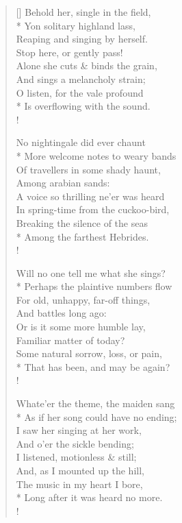 \documentclass[MAIN]{subfiles}
\begin{document}
\settowidth{\versewidth}{Behold her, single in the field,}
\begin{verse}[\versewidth]
Behold her, single in the field,\\* 
\vin Yon solitary highland lass,\\
Reaping and singing by herself.\\ 
\vin Stop here, or gently pass!\\
Alone she cuts \& binds the grain,\\
And sings a melancholy strain;\\
O listen, for the vale profound\\*
Is overflowing with the sound.\\!

No nightingale did ever chaunt\\* 
\vin More welcome notes to weary bands\\ 
Of travellers in some shady haunt,\\
\vin Among arabian sands:\\
A voice so thrilling ne'er was heard\\
In spring-time from the cuckoo-bird,\\
Breaking the silence of the seas\\*
Among the farthest Hebrides.\\!

Will no one tell me what she sings?\\* 
\vin Perhaps the plaintive numbers flow\\
For old, unhappy, far-off things,\\
\vin And battles long ago:\\
Or is it some more humble lay,\\ 
Familiar matter of today?\\
Some natural sorrow, loss, or pain,\\* 
That has been, and may be again?\\!

Whate'er the theme, the maiden sang\\* 
\vin As if her song could have no ending;\\
I saw her singing at her work,\\
\vin And o'er the sickle bending;\\
I listened, motionless \& still;\\
And, as I mounted up the hill,\\
The music in my heart I bore,\\*
Long after it was heard no more.\\!
\end{verse}
\end{document}
